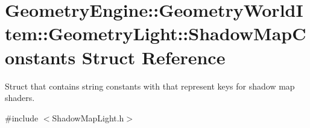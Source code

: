 \hypertarget{struct_geometry_engine_1_1_geometry_world_item_1_1_geometry_light_1_1_shadow_map_constants}{}\section{Geometry\+Engine\+::Geometry\+World\+Item\+::Geometry\+Light\+::Shadow\+Map\+Constants Struct Reference}
\label{struct_geometry_engine_1_1_geometry_world_item_1_1_geometry_light_1_1_shadow_map_constants}


Struct that contains string constants with that represent keys for shadow map shaders.  




{\ttfamily \#include $<$Shadow\+Map\+Light.\+h$>$}

